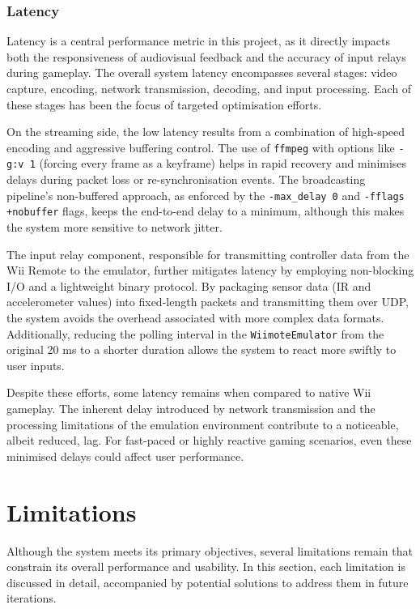 \subsubsection{Latency}

Latency is a central performance metric in this project, as it directly impacts
both the responsiveness of audiovisual feedback and the accuracy of input relays
during gameplay. The overall system latency encompasses several stages: video
capture, encoding, network transmission, decoding, and input processing. Each of
these stages has been the focus of targeted optimisation efforts.

On the streaming side, the low latency results from a combination of
high-speed encoding and aggressive buffering control. The use of \texttt{ffmpeg}
with options like \texttt{-g:v 1} (forcing every frame as a keyframe) helps in
rapid recovery and minimises delays during packet loss or re-synchronisation
events. The broadcasting pipeline’s non-buffered approach, as enforced by the
\texttt{-max\_delay 0} and \texttt{-fflags +nobuffer} flags, keeps the
end-to-end delay to a minimum, although this makes the system more
sensitive to network jitter.

The input relay component, responsible for transmitting controller data from the
Wii Remote to the emulator, further mitigates latency by employing non-blocking
I/O and a lightweight binary protocol. By packaging sensor data (IR and
accelerometer values) into fixed-length packets and transmitting them over UDP,
the system avoids the overhead associated with more complex data formats.
Additionally, reducing the polling interval in the \texttt{WiimoteEmulator} from
the original 20 ms to a shorter duration allows the system to react more swiftly
to user inputs.

Despite these efforts, some latency remains when compared to native Wii
gameplay. The inherent delay introduced by network transmission and the
processing limitations of the emulation environment contribute to a noticeable,
albeit reduced, lag. For fast-paced or highly reactive gaming scenarios, even
these minimised delays could affect user performance.

\section{Limitations}

Although the system meets its primary objectives, several limitations remain that constrain its overall performance and usability. In this section, each limitation is discussed in detail, accompanied by potential solutions to address them in future iterations.

